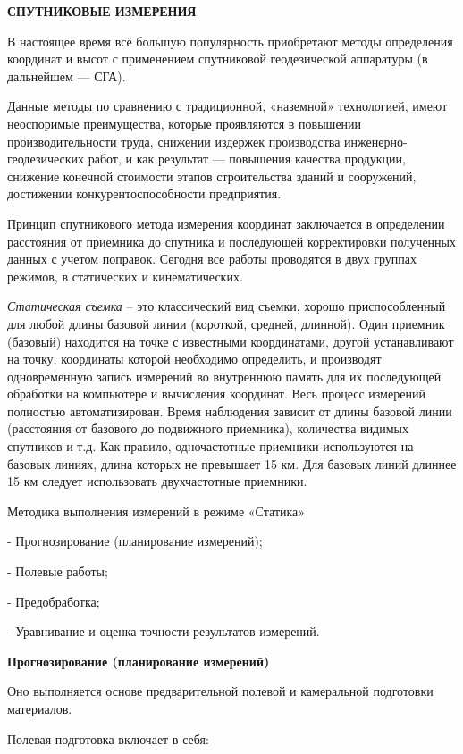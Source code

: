 \documentclass[a4paper]{article}
\begin{document}
{\begin{newpage}
\begin{center}
    \large{\textbf{СПУТНИКОВЫЕ ИЗМЕРЕНИЯ}}
\end{center}
\par В настоящее время всё большую популярность приобретают методы определения координат и высот с применением спутниковой геодезической аппаратуры (в дальнейшем — СГА).
\par Данные методы по сравнению с традиционной, «наземной» технологией, имеют неоспоримые преимущества, которые проявляются в повышении производительности труда, снижении издержек производства инженерно-геодезических работ, и как результат — повышения качества продукции, снижение конечной стоимости этапов строительства зданий и сооружений, достижении конкурентоспособности предприятия.
\par Принцип спутникового метода измерения координат заключается в определении расстояния от приемника до спутника и последующей корректировки полученных данных с учетом поправок. Сегодня все работы проводятся в двух группах режимов, в статических и кинематических.
\par \textit{Статическая съемка} – это классический вид съемки, хорошо приспособленный для любой длины базовой линии (короткой, средней, длинной). Один приемник (базовый) находится на точке с известными координатами, другой устанавливают на точку, координаты которой необходимо определить, и производят одновременную запись измерений во внутреннюю память для их последующей обработки на компьютере и вычисления координат. Весь процесс измерений полностью автоматизирован. Время наблюдения зависит от длины базовой линии (расстояния от базового до подвижного приемника), количества видимых спутников и т.д. Как правило, одночастотные приемники используются на базовых линиях, длина которых не превышает 15 км. Для базовых линий длиннее 15 км следует использовать двухчастотные приемники.
\par Методика выполнения измерений в режиме «Статика»
\par - Прогнозирование (планирование измерений);
\par - Полевые работы;
\par - Предобработка;
\par - Уравнивание и оценка точности результатов измерений.
\begin{center}
    \large {\textbf{Прогнозирование (планирование измерений)}}
\end{center}
\par Оно выполняется основе предварительной полевой и камеральной подготовки материалов.
\par Полевая подготовка включает в себя:

\end{newpage}}
\end{document}
